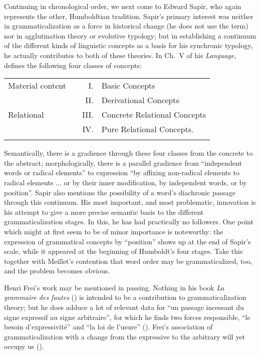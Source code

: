 Continuing in chronological order, we next come to Edward Sapir, who again represents the other, Humboldtian tradition. Sapir's primary interest was neither in grammaticalization as a force in historical change (he does not use the term) nor in agglutination theory or evolutive typology; but in establishing a continuum of the different kinds of linguistic concepts as a basis for his synchronic typology, he actually contributes to both of these theories. In Ch.~V of his \textit{Language}, \citet[102]{Sapir1921} defines the following four classes of concepts:\label{SapirHumCh4}

\begin{table}[H] %
\begin{tabular}{llrl}
\lsptoprule
{Material content} &  & I. & Basic Concepts\\
 &  & II. & Derivational Concepts\\
\midrule
{Relational} &  & III. & Concrete Relational Concepts\\
&  & IV. & Pure Relational Concepts.\\
\lspbottomrule
\end{tabular}
\end{table}

\newpage
\noindent Semantically, there is a gradience through these four classes from the concrete to the abstract; morphologically, there is a parallel gradience from “independent words or radical elements” to expression “by affixing non-radical elements to radical elements ... or by their inner modification, by independent words, or by position”. Sapir also mentions the possibility of a word's diachronic passage through this continuum. His most important, and most problematic, innovation is his attempt to give a more precise semantic basis to the different grammaticalization stages. In this, he has had practically no followers.\label{page6} One point which might at first seem to be of minor importance is noteworthy: the expression of grammatical concepts by “position” shows up at the end of Sapir's scale, while it appeared at the beginning of Humboldt's four stages. Take this together with Meillet's contention that word order may be grammaticalized, too, and the problem becomes obvious.

Henri Frei's work may be mentioned in passing. Nothing in his book \textit{La grammaire des fautes} (\citeyear{Frei1929}) is intended to be a contribution to grammaticalization theory; but he does adduce a lot of relevant data for “un passage incessant du signe expressif au signe arbitraire”, for which he finds two forces responsible, “le besoin d'expressivité” and “la loi de l'usure” (\citeyear[233]{Frei1929}). Frei's association of grammaticalization with a change from the expressive to the arbitrary will yet occupy us (\citeyear[115]{Frei1929}).

